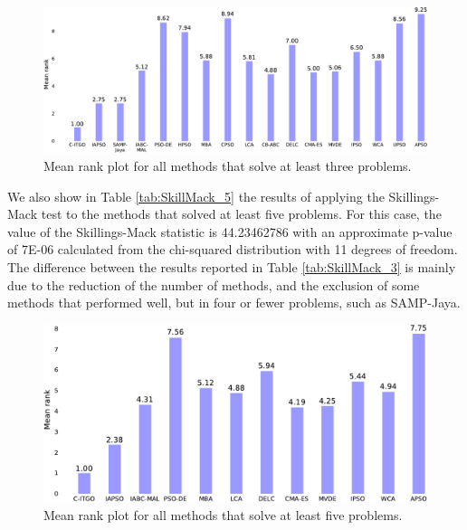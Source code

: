\begin{figure}[h]
    \begin{center}
    \includegraphics[scale=0.6]{Imgs/SkillMack_3-crop.pdf}
    \end{center}
    \captionsetup{justification=centering}
    \vspace*{-4mm}
    \caption{Mean rank plot for all methods that solve at least three problems.}\label{fig:SkillMack_3}
\end{figure}



We also show in Table \ref{tab:SkillMack_5} the results of applying the Skillings-Mack test to the methods that solved at least five problems. For this case, the value of the Skillings-Mack statistic is 44.23462786 with an approximate p-value of 7E-06 calculated from the chi-squared distribution with 11 degrees of freedom. The difference between the results reported in Table \ref{tab:SkillMack_3} is mainly due to the reduction of the number of methods, and the exclusion of some methods that performed well, but in four or fewer problems, such as SAMP-Jaya.



\begin{figure}[bp]
    \begin{center}
    \includegraphics[scale=0.6]{Imgs/SkillMack_5-crop.pdf}
    \end{center}
    \captionsetup{justification=centering}
    \vspace*{-4mm}
    \caption{Mean rank plot for all methods that solve at least five problems.}\label{fig:SkillMack_5}
\end{figure}

